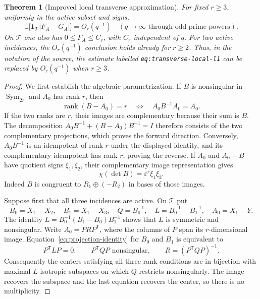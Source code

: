 \documentclass[11pt,a4paper]{article}
\newtheorem{theorem}{Theorem}[section]
\theoremstyle{definition}
\theoremstyle{remark}
\newcommand{\E}{\mathbb E}
\newcommand{\Sym}{\operatorname{Sym}}
\newcommand{\rank}{\operatorname{rank}}
\newcommand{\eps}{\varepsilon}
\newcommand{\one}{\mathbf 1}
\begin{document}
\begin{theorem}[Improved local transverse approximation]\label{thm:local}
For fixed $r\ge3$, uniformly in the active subset and signs,
\begin{equation}\label{eq:local-improvement}
 \E\bigl[\one_{\mathcal T}|F_A-G_A|\bigr]=O_r(q^{-1})
 \quad(q\to\infty\text{ through odd prime powers}).
\end{equation}
On $\mathcal T$ one also has $0\le F_A\le C_r$, with $C_r$ independent
of $q$. For two active incidences, the $O_r(q^{-1})$ conclusion holds
already for $r\ge2$. Thus, in the notation of the source, the estimate
labelled \texttt{eq:transverse-local-l1} can be replaced by
$O_r(q^{-1})$ when $r\ge3$.
\end{theorem}
\begin{proof}
We first establish the algebraic parametrization. If $B$ is nonsingular
in $\Sym_{2r}$ and $A_0$ has rank $r$, then
\begin{equation}\label{eq:projection-identity}
 \rank(B-A_0)=r\quad\Longleftrightarrow\quad A_0B^{-1}A_0=A_0.
\end{equation}
If the two ranks are $r$, their images are complementary because their
sum is $B$. The decomposition
$A_0B^{-1}+(B-A_0)B^{-1}=I$ therefore consists of the two complementary
projections, which proves the forward direction. Conversely,
$A_0B^{-1}$ is an idempotent of rank $r$ under the displayed identity,
and its complementary idempotent has rank $r$, proving the reverse.
If $A_0$ and $A_0-B$ have quotient signs $\xi_1,\xi_2$, their
complementary image representation gives
\begin{equation}\label{eq:pair-match}
 \chi(\det B)=\eps^r\xi_1\xi_2.
\end{equation}
Indeed $B$ is congruent to $R_1\oplus(-R_2)$ in bases of those images.

Suppose first that all three incidences are active. On $\mathcal T$ put
\[
 B_0=X_1-X_2,\quad B_1=X_1-X_3,\quad
 Q=B_0^{-1},\quad L=B_0^{-1}-B_1^{-1},\quad A_0=X_1-Y.
\]
The identity $L=B_0^{-1}(B_1-B_0)B_1^{-1}$ shows that $L$ is symmetric
and nonsingular. Write $A_0=PRP^{\mathsf T}$, where the columns of $P$
span its $r$-dimensional image. Equation~\eqref{eq:projection-identity}
for $B_0$ and $B_1$ is equivalent to
\begin{equation}\label{eq:local-parametrization}
 P^{\mathsf T}LP=0,\qquad P^{\mathsf T}QP\text{ nonsingular},\qquad
 R=(P^{\mathsf T}QP)^{-1}.
\end{equation}
Consequently the centers satisfying all three rank conditions are in
bijection with maximal $L$-isotropic subspaces on which $Q$ restricts
nonsingularly. The image recovers the subspace and the last equation
recovers the center, so there is no multiplicity.


\end{proof}
\end{document}
